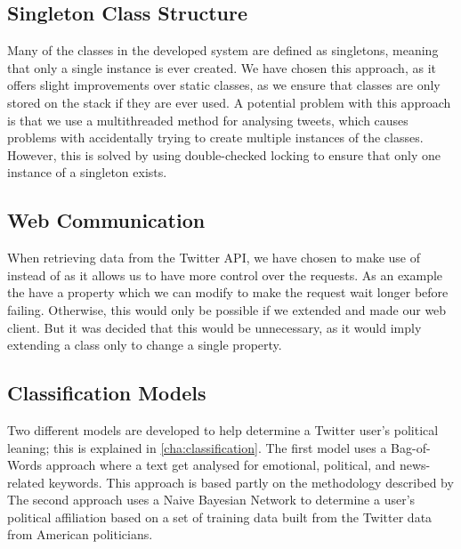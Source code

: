 \subsection{Singleton Class Structure}
Many of the classes in the developed system are defined as singletons, meaning
that only a single instance is ever created. We have chosen this approach, as it
offers slight improvements over static classes, as we ensure that classes are
only stored on the stack if they are ever used. A potential problem with this
approach is that we use a multithreaded method for analysing tweets, which
causes problems with accidentally trying to create multiple instances of the
classes. However, this is solved by using double-checked locking to ensure that
only one instance of a singleton exists.

\subsection{Web Communication}
When retrieving data from the Twitter API, we have chosen to make use of
 instead of  as it allows us to have more
control over the requests. As an example the  have a
 property which we can modify to make the request wait longer
before failing. Otherwise, this would only be possible if we extended
 and made our web client. But it was decided that this would be
unnecessary, as it would imply extending a class only to change a single
property.

\subsection{Classification Models}
Two different models are developed to help determine a Twitter user's political
leaning; this is explained in \autoref{cha:classification}. The first model uses
a Bag-of-Words approach where a text get analysed for emotional, political, and
news-related keywords. This approach is based partly on the methodology
described by \\
The second approach uses a Naive Bayesian Network to determine a user's
political affiliation based on a set of training data built from the Twitter
data from American politicians.




